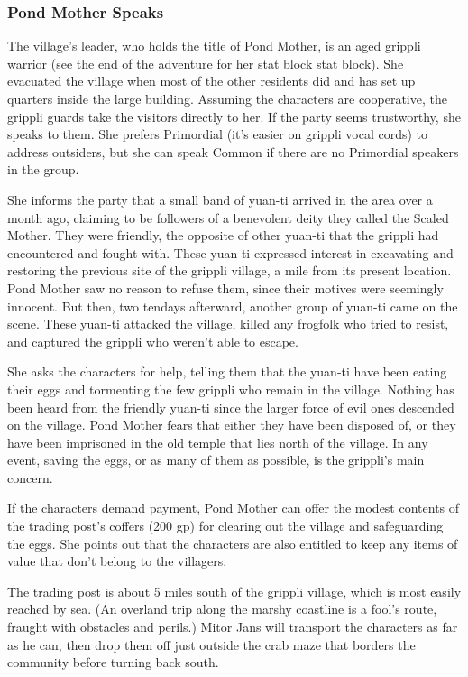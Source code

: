 \documentclass[10pt,a4paper,twoside,bg=print,twocolumn,openany,nodeprecatedcode]{dndbook}
\begin{document}
\subsubsection{Pond Mother Speaks}
The village's leader, who holds the title of Pond Mother, is an aged grippli warrior (see the end of the adventure for her stat block stat block). She evacuated the village when most of the other residents did and has set up quarters inside the large building. Assuming the characters are cooperative, the grippli guards take the visitors directly to her. If the party seems trustworthy, she speaks to them. She prefers Primordial (it's easier on grippli vocal cords) to address outsiders, but she can speak Common if there are no Primordial speakers in the group.

She informs the party that a small band of yuan-ti arrived in the area over a month ago, claiming to be followers of a benevolent deity they called the Scaled Mother. They were friendly, the opposite of other yuan-ti that the grippli had encountered and fought with. These yuan-ti expressed interest in excavating and restoring the previous site of the grippli village, a mile from its present location. Pond Mother saw no reason to refuse them, since their motives were seemingly innocent. But then, two tendays afterward, another group of yuan-ti came on the scene. These yuan-ti attacked the village, killed any frogfolk who tried to resist, and captured the grippli who weren't able to escape.

She asks the characters for help, telling them that the yuan-ti have been eating their eggs and tormenting the few grippli who remain in the village. Nothing has been heard from the friendly yuan-ti since the larger force of evil ones descended on the village. Pond Mother fears that either they have been disposed of, or they have been imprisoned in the old temple that lies north of the village. In any event, saving the eggs, or as many of them as possible, is the grippli's main concern.

If the characters demand payment, Pond Mother can offer the modest contents of the trading post's coffers (200 gp) for clearing out the village and safeguarding the eggs. She points out that the characters are also entitled to keep any items of value that don't belong to the villagers.

The trading post is about 5 miles south of the grippli village, which is most easily reached by sea. (An overland trip along the marshy coastline is a fool's route, fraught with obstacles and perils.) Mitor Jans will transport the characters as far as he can, then drop them off just outside the crab maze that borders the community before turning back south.
\end{document}
